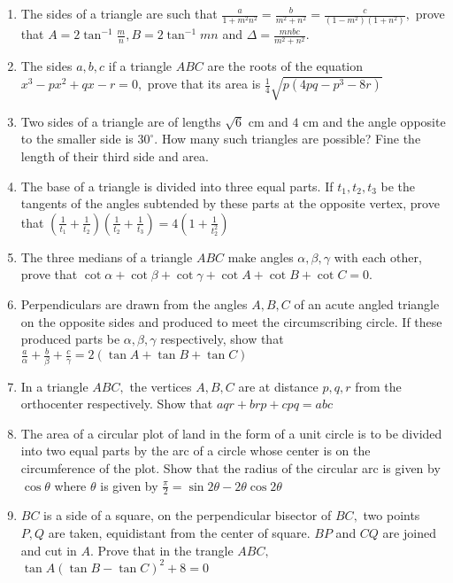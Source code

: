 \begin{enumerate}
\item The sides of a triangle are such that $\frac{a}{1 + m^2n^2} = \frac{b}{m^2 + n^2} = \frac{c}{(1- m^2)(1 + n^2)},$ prove
    that $A = 2\tan^{-1}\frac{m}{n}, B = 2\tan^{-1}mn$ and $\Delta = \frac{mnbc}{m^2 + n^2}.$

\item The sides $a, b, c$ if a triangle $ABC$ are the roots of the equation $x^3 - px^2 + qx - r = 0,$ prove that
    its area is $\frac{1}{4}\sqrt{p(4pq - p^3 - 8r)}$

\item Two sides of a triangle are of lengths $\sqrt{6}$ cm and $4$ cm and the angle opposite to the smaller side is
     $30^\circ.$ How many such triangles are possible? Fine the length of their third side and area.

\item The base of a triangle is divided into three equal parts. If $t_1, t_2, t_3$ be the tangents of the angles subtended by
     these parts at the opposite vertex, prove that $\left(\frac{1}{t_1} + \frac{1}{t_2}\right)\left(\frac{1}{t_2} +
     \frac{1}{t_3}\right) = 4\left(1 + \frac{1}{t_2^2}\right)$

\item The three medians of a triangle $ABC$ make angles $\alpha, \beta, \gamma$ with each other, prove that
     $\cot\alpha + \cot\beta + \cot\gamma + \cot A + \cot B + \cot C = 0.$

\item Perpendiculars are drawn from the angles $A, B, C$ of an acute angled triangle on the opposite sides and produced to
     meet the circumscribing circle. If these produced parts be $\alpha, \beta, \gamma$ respectively, show that
     $\frac{a}{\alpha} + \frac{b}{\beta} + \frac{c}{\gamma} = 2(\tan A + \tan B + \tan C)$

\item In a triangle $ABC,$ the vertices $A, B, C$ are at distance $p, q, r$ from the orthocenter
     respectively. Show that $aqr + brp + cpq = abc$

\item The area of a circular plot of land in the form of a unit circle is to be divided into two equal parts by the arc of a circle
     whose center is on the circumference of the plot. Show that the radius of the circular arc is given by $\cos\theta$
     where $\theta$ is given by $\frac{\pi}{2} = \sin2\theta - 2\theta\cos2\theta$

\item $BC$ is a side of a square, on the perpendicular bisector of $BC,$ two points $P, Q$ are taken, equidistant
     from the center of square. $BP$ and $CQ$ are joined and cut in $A.$ Prove that in the trangle $ABC,$
     $\tan A(\tan B - \tan C)^2 + 8 = 0$


\end{enumerate}

